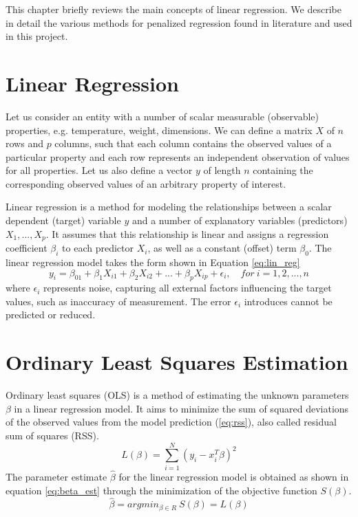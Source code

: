 This chapter briefly reviews the main concepts of linear regression. We describe in detail the various methods for penalized regression found in literature and used in this project.


\section{Linear Regression}
Let us consider an entity with a number of scalar measurable (observable) properties, e.g. temperature, weight, dimensions. We can define a matrix $X$ of $n$ rows and $p$ columns, such that each column contains the observed values of a particular property and each row represents an independent observation of values for all properties. Let us also define a vector $y$ of length $n$ containing the corresponding observed values of an arbitrary property of interest.

Linear regression is a method for modeling the relationships between a scalar dependent (target) variable $y$ and a number of explanatory variables (predictors) $X_1,...,X_p$. It assumes that this relationship is linear and assigns a regression coefficient $\beta_i$ to each predictor $X_i$, as well as a constant (offset) term $\beta_0$. The linear regression model takes the form shown in Equation \ref{eq:lin_reg}
\begin{equation} \label{eq:lin_reg}
y_i = \beta_01+\beta_1X_{i1}+\beta_2X_{i2}+...+\beta_pX_{ip}+\epsilon_i, \quad for\ i=1,2,...,n
\end{equation}
where $\epsilon_i$ represents noise, capturing all external factors influencing the target values, such as inaccuracy of measurement. The error $\epsilon_i$ introduces cannot be predicted or reduced.


\section{Ordinary Least Squares Estimation} \label{sec:olse}
Ordinary least squares (OLS) is a method of estimating the unknown parameters $\beta$ in a linear regression model. It aims to minimize the sum of squared deviations of the observed values from the model prediction (\ref{eq:rss}), also called residual sum of squares (RSS).
\begin{equation} \label{eq:rss}
L(\beta) = \sum_{i=1}^{N} (y_i - x_i^T\beta)^2
\end{equation}
The parameter estimate $\hat{\beta}$ for the linear regression model is obtained as shown in equation \ref{eq:beta_est} through the minimization of the objective function $S(\beta)$.
\begin{equation} \label{eq:beta_est}
\hat{\beta} = argmin_{\beta \in R}\ S(\beta) = L(\beta)
\end{equation}


